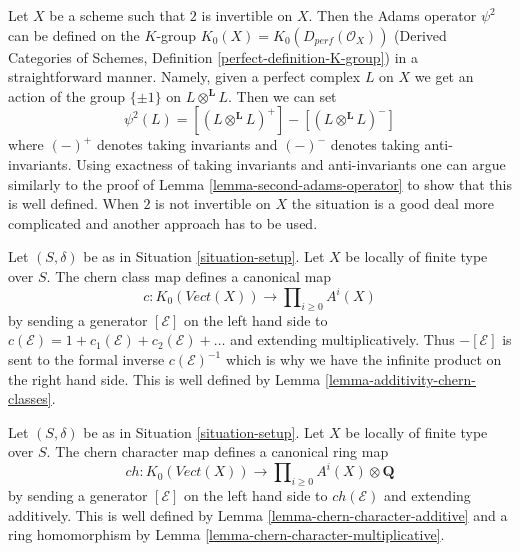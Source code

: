 \begin{remark}
\label{remark-adams-derived}
Let $X$ be a scheme such that $2$ is invertible on $X$.
Then the Adams operator $\psi^2$ can be defined on the $K$-group
$K_0(X) = K_0(D_{perf}(\mathcal{O}_X))$
(Derived Categories of Schemes, Definition \ref{perfect-definition-K-group})
in a straightforward manner.
Namely, given a perfect complex $L$ on $X$ we get an action
of the group $\{\pm 1\}$ on $L \otimes^\mathbf{L} L$.
Then we can set
$$
\psi^2(L) = [(L \otimes^\mathbf{L} L)^+] -
[(L \otimes^\mathbf{L} L)^-]
$$
where $(-)^+$ denotes taking invariants and $(-)^-$ denotes taking
anti-invariants.
Using exactness of taking invariants and anti-invariants one can
argue similarly to the proof of Lemma \ref{lemma-second-adams-operator}
to show that this is well defined.
When $2$ is not invertible on $X$ the situation is a good deal more
complicated and another approach has to be used.
\end{remark}

\begin{remark}
\label{remark-chern-classes-K}
Let $(S, \delta)$ be as in Situation \ref{situation-setup}.
Let $X$ be locally of finite type over $S$. The chern class
map defines a canonical map
$$
c : K_0(\textit{Vect}(X)) \longrightarrow \prod\nolimits_{i \geq 0} A^i(X)
$$
by sending a generator $[\mathcal{E}]$ on the left hand side to
$c(\mathcal{E}) = 1 + c_1(\mathcal{E}) + c_2(\mathcal{E}) + \ldots$
and extending multiplicatively. Thus $-[\mathcal{E}]$ is sent to
the formal inverse $c(\mathcal{E})^{-1}$ which is why we have the
infinite product on the right hand side. This is well defined by
Lemma \ref{lemma-additivity-chern-classes}.
\end{remark}

\begin{remark}
\label{remark-chern-character-K}
Let $(S, \delta)$ be as in Situation \ref{situation-setup}.
Let $X$ be locally of finite type over $S$. The chern character
map defines a canonical ring map
$$
ch : K_0(\textit{Vect}(X)) \longrightarrow
\prod\nolimits_{i \geq 0} A^i(X) \otimes \mathbf{Q}
$$
by sending a generator $[\mathcal{E}]$ on the left hand side to
$ch(\mathcal{E})$ and extending additively. This is well defined
by Lemma \ref{lemma-chern-character-additive} and a ring homomorphism by
Lemma \ref{lemma-chern-character-multiplicative}.
\end{remark}

